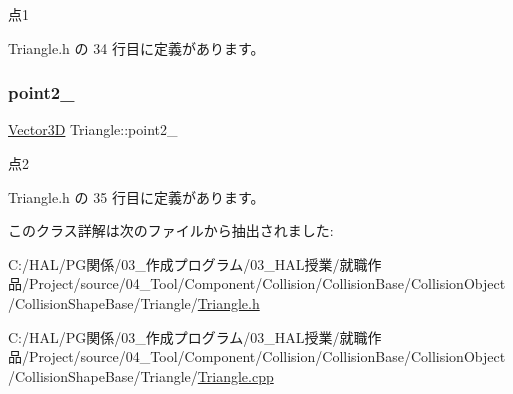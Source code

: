 点1 



 Triangle.\+h の 34 行目に定義があります。

\mbox{\label{class_triangle_af1850003b6274357b9b081395e1ab4e8}} 
\subsubsection{\texorpdfstring{point2\+\_\+}{point2\_}}
{\footnotesize\ttfamily \mbox{\hyperlink{class_vector3_d}{Vector3D}} Triangle\+::point2\+\_\+\hspace{0.3cm}{\ttfamily [private]}}



点2 



 Triangle.\+h の 35 行目に定義があります。



このクラス詳解は次のファイルから抽出されました\+:\begin{DoxyCompactItemize}
\item 
C\+:/\+H\+A\+L/\+P\+G関係/03\+\_\+作成プログラム/03\+\_\+\+H\+A\+L授業/就職作品/\+Project/source/04\+\_\+\+Tool/\+Component/\+Collision/\+Collision\+Base/\+Collision\+Object/\+Collision\+Shape\+Base/\+Triangle/\mbox{\hyperlink{_triangle_8h}{Triangle.\+h}}\item 
C\+:/\+H\+A\+L/\+P\+G関係/03\+\_\+作成プログラム/03\+\_\+\+H\+A\+L授業/就職作品/\+Project/source/04\+\_\+\+Tool/\+Component/\+Collision/\+Collision\+Base/\+Collision\+Object/\+Collision\+Shape\+Base/\+Triangle/\mbox{\hyperlink{_triangle_8cpp}{Triangle.\+cpp}}\end{DoxyCompactItemize}
